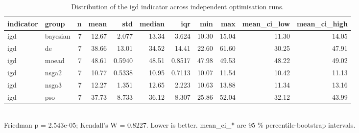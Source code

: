 \begin{table}[!t]
\centering
\caption{Distribution of the igd indicator across independent optimisation runs.}
\label{tab:statistics_optimizer_igd_main}
\footnotesize
\begin{tabular}{llrrrrrrrrr}
\toprule
indicator & group & n & mean & std & median & iqr & min & max & mean\_ci\_low & mean\_ci\_high \\
\midrule
igd & bayesian & 7 & 12.67 & 2.077 & 13.34 & 3.624 & 10.30 & 15.04 & 11.30 & 14.05 \\
igd & de & 7 & 38.66 & 13.01 & 34.52 & 14.41 & 22.60 & 61.60 & 30.25 & 47.91 \\
igd & moead & 7 & 48.61 & 0.5940 & 48.51 & 0.8517 & 47.98 & 49.53 & 48.22 & 49.02 \\
igd & nsga2 & 7 & 10.77 & 0.5338 & 10.95 & 0.7113 & 10.07 & 11.54 & 10.42 & 11.13 \\
igd & nsga3 & 7 & 12.27 & 1.351 & 12.65 & 2.223 & 10.63 & 13.88 & 11.34 & 13.16 \\
igd & pso & 7 & 37.73 & 8.733 & 36.12 & 8.307 & 25.86 & 52.04 & 32.12 & 43.99 \\
\bottomrule
\end{tabular}
\\[2pt] \footnotesize Friedman p = 2.543e-05; Kendall's W = 0.8227. Lower is better. mean\_ci\_* are 95 \% percentile-bootstrap intervals.
\end{table}
